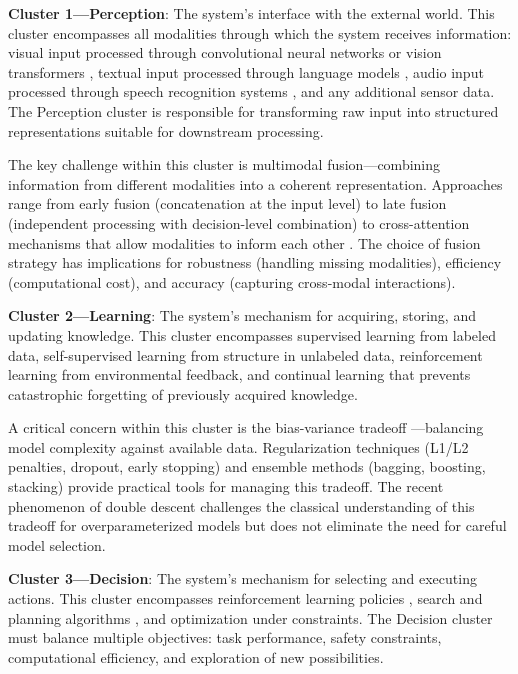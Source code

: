 \documentclass[11pt,a4paper]{article}
\begin{document}
\textbf{Cluster 1---Perception}: The system's interface with the external world. This cluster encompasses all modalities through which the system receives information: visual input processed through convolutional neural networks or vision transformers \citep{dosovitskiy2021}, textual input processed through language models \citep{vaswani2017}, audio input processed through speech recognition systems \citep{radford2023}, and any additional sensor data. The Perception cluster is responsible for transforming raw input into structured representations suitable for downstream processing.

The key challenge within this cluster is multimodal fusion---combining information from different modalities into a coherent representation. Approaches range from early fusion (concatenation at the input level) to late fusion (independent processing with decision-level combination) to cross-attention mechanisms that allow modalities to inform each other \citep{jaegle2021}. The choice of fusion strategy has implications for robustness (handling missing modalities), efficiency (computational cost), and accuracy (capturing cross-modal interactions).

\textbf{Cluster 2---Learning}: The system's mechanism for acquiring, storing, and updating knowledge. This cluster encompasses supervised learning from labeled data, self-supervised learning from structure in unlabeled data, reinforcement learning from environmental feedback, and continual learning that prevents catastrophic forgetting of previously acquired knowledge.

A critical concern within this cluster is the bias-variance tradeoff \citep{belkin2019}---balancing model complexity against available data. Regularization techniques (L1/L2 penalties, dropout, early stopping) and ensemble methods (bagging, boosting, stacking) provide practical tools for managing this tradeoff. The recent phenomenon of double descent challenges the classical understanding of this tradeoff for overparameterized models but does not eliminate the need for careful model selection.

\textbf{Cluster 3---Decision}: The system's mechanism for selecting and executing actions. This cluster encompasses reinforcement learning policies \citep{schulman2017}, search and planning algorithms \citep{silver2016}, and optimization under constraints. The Decision cluster must balance multiple objectives: task performance, safety constraints, computational efficiency, and exploration of new possibilities.
\end{document}
